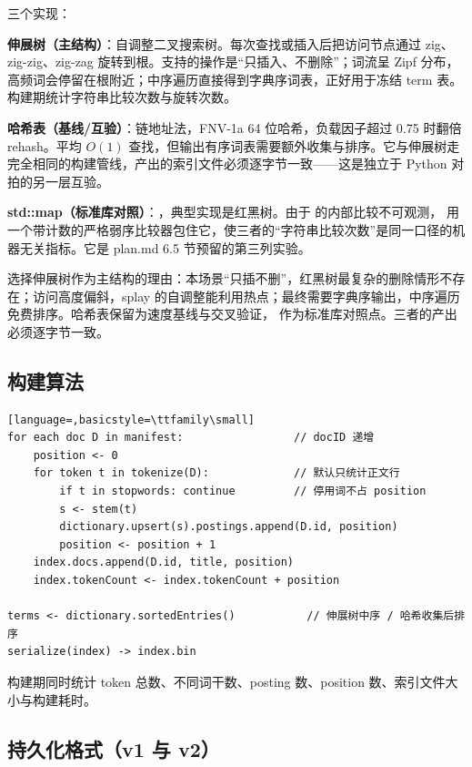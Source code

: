 三个实现：

\textbf{伸展树（主结构）}：自调整二叉搜索树。每次查找或插入后把访问节点通过 zig、zig-zig、zig-zag 旋转到根。支持的操作是“只插入、不删除”；词流呈 Zipf 分布，高频词会停留在根附近；中序遍历直接得到字典序词表，正好用于冻结 term 表。构建期统计字符串比较次数与旋转次数。

\textbf{哈希表（基线/互验）}：链地址法，FNV-1a 64 位哈希，负载因子超过 0.75 时翻倍 rehash。平均 $O(1)$ 查找，但输出有序词表需要额外收集与排序。它与伸展树走完全相同的构建管线，产出的索引文件必须逐字节一致——这是独立于 Python 对拍的另一层互验。

\textbf{std::map（标准库对照）}：，典型实现是红黑树。由于  的内部比较不可观测， 用一个带计数的严格弱序比较器包住它，使三者的“字符串比较次数”是同一口径的机器无关指标。它是 plan.md 6.5 节预留的第三列实验。

选择伸展树作为主结构的理由：本场景“只插不删”，红黑树最复杂的删除情形不存在；访问高度偏斜，splay 的自调整能利用热点；最终需要字典序输出，中序遍历免费排序。哈希表保留为速度基线与交叉验证， 作为标准库对照点。三者的产出必须逐字节一致。

\subsection{构建算法}

\begin{lstlisting}[language=,basicstyle=\ttfamily\small]
for each doc D in manifest:                 // docID 递增
    position <- 0
    for token t in tokenize(D):             // 默认只统计正文行
        if t in stopwords: continue         // 停用词不占 position
        s <- stem(t)
        dictionary.upsert(s).postings.append(D.id, position)
        position <- position + 1
    index.docs.append(D.id, title, position)
    index.tokenCount <- index.tokenCount + position

terms <- dictionary.sortedEntries()           // 伸展树中序 / 哈希收集后排序
serialize(index) -> index.bin
\end{lstlisting}

构建期同时统计 token 总数、不同词干数、posting 数、position 数、索引文件大小与构建耗时。

\subsection{持久化格式（v1 与 v2）}

